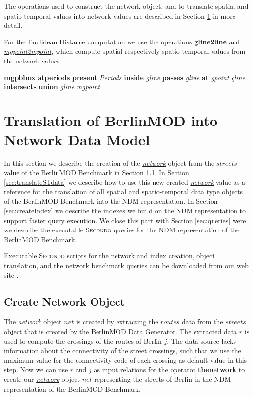\documentclass[a4paper]{article}
\newcommand{\secondo}{\textsc{Secondo}}
\newcommand{\bmodb} {BerlinMOD Benchmark}
\newcommand{\op}[1]{\textbf{#1}}
\newcommand{\dt}[1]{\textsl{\underline{#1}}}
\begin{document}
The operations used to construct the network object, and to translate spatial and
spatio-temporal values into network values are described in Section \ref{sec:Translation}
in more detail.

For the Euclidean Distance computation we use the operations \op{gline2line} and
\dt{mgpoint2mpoint}, which compute spatial respectively spatio-temporal values
from the network values.


\op{mgpbbox}
\op{atperiods}
\op{present} \dt{Periods}
\op{inside} \dt{gline}
\op{passes} \dt{gline}
\op{at} \dt{gpoint} \dt{gline}
\op{intersects}
\op{union} \dt{gline} \dt{mgpoint}



\section{Translation of BerlinMOD into Network Data Model}
\label{sec:Translation}
In this section we describe the creation of the \dt{network} object from the $streets$
value of the \bmodb{} in Section \ref{sec:createNetwork}. In Section
\ref{sec:translateSTdata} we describe how to use this new created \dt{network}
value as a reference for the translation of all spatial and spatio-temporal data
type objects of the \bmodb{} into the NDM representation.
In Section \ref{sec:createIndex} we describe the indexes we build on the NDM
representation to support faster query execution. We close this part
with Section \ref{sec:queries} were we describe the executable \secondo{} queries
for the NDM representation of the \bmodb{}.

Executable \secondo{} scripts for the network and index creation, object translation,
and the network benchmark queries can be downloaded from our web site \cite{NetworkWeb}.
\subsection{Create Network Object}
\label{sec:createNetwork}
The \dt{network} object $net$ is created by extracting the $routes$ data from
the $streets$ object that is created by the BerlinMOD Data Generator.
The extracted data $r$ is used to compute the crossings of the
routes of Berlin $j$. The data source lacks information about the connectivity
of the street crossings, such that we use the maximum value for the connectivity
code of each crossing as default value in this step.
Now we can use $r$ and $j$ as input relations for the operator \op{thenetwork}
to create our \dt{network} object $net$ representing the streets of Berlin in
the NDM representation of the \bmodb{}.
\end{document}
